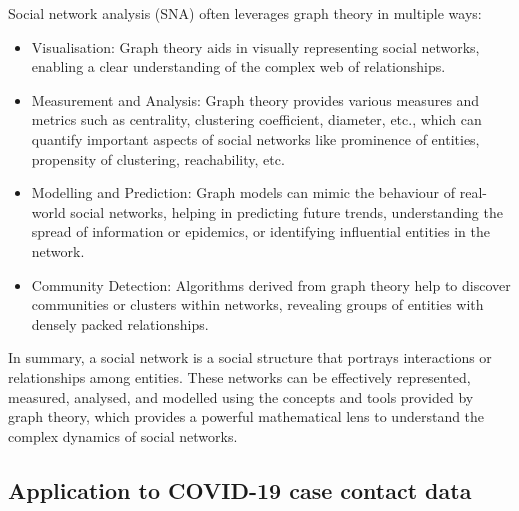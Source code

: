 \bigskip
\noindent Social network analysis (SNA) often leverages graph theory in multiple ways:

\begin{itemize}
	\item Visualisation: Graph theory aids in visually representing social networks, enabling a clear understanding of the complex web of relationships.
	\item Measurement and Analysis: Graph theory provides various measures and metrics such as centrality, clustering coefficient, diameter, etc., which can quantify important aspects of social networks like prominence of entities, propensity of clustering, reachability, etc.
	\item Modelling and Prediction: Graph models can mimic the behaviour of real-world social networks, helping in predicting future trends, understanding the spread of information or epidemics, or identifying influential entities in the network.
	\item Community Detection: Algorithms derived from graph theory help to discover communities or clusters within networks, revealing groups of entities with densely packed relationships.
\end{itemize}

\noindent In summary, a social network is a social structure that portrays interactions or relationships among entities. These networks can be effectively represented, measured, analysed, and modelled using the concepts and tools provided by graph theory, which provides a powerful mathematical lens to understand the complex dynamics of social networks. 

\subsection{Application to COVID-19 case contact data}
\label{sec:social_networks_application}

